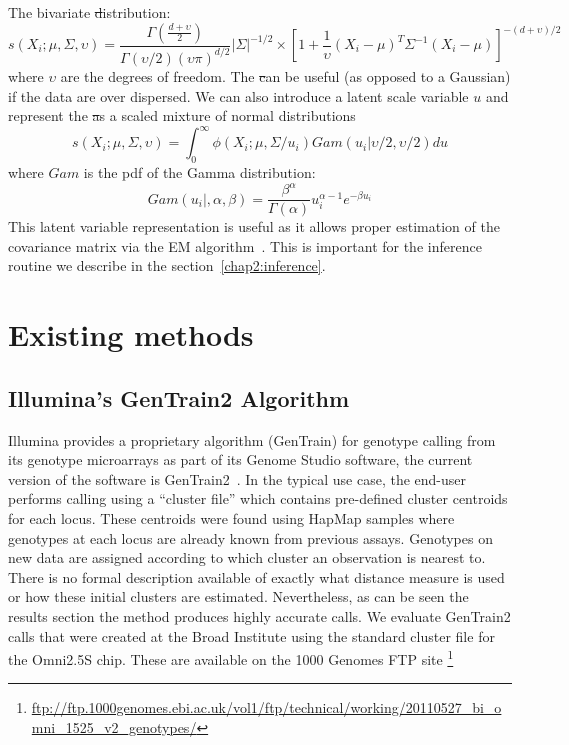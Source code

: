 The bivariate \st distribution:
$$s(X_i;\mu,\Sigma,\upsilon) = \frac{\Gamma(\frac{d+\upsilon}{2})}{\Gamma(\upsilon/2)(\upsilon\pi)^{d/2}}|\Sigma|^{-1/2} \times [1+\frac{1}{\upsilon}(X_i - \mu)^T \Sigma^{-1}(X_i - \mu)]^{-(d+\upsilon)/2}$$
where $\upsilon$ are the degrees of freedom.  The \st can be useful (as opposed to a Gaussian) if the data are over dispersed. We can also introduce a latent scale variable $u$ and represent the \st as a scaled mixture of normal distributions 
$$s(X_i;\mu,\Sigma,\upsilon) = \int_0^{\infty} \phi(X_i;\mu,\Sigma / u_i)Gam(u_i|\upsilon/2,\upsilon/2) du$$ where $Gam$ is the pdf of the Gamma distribution:
$$Gam(u_i|,\alpha,\beta) = \frac{\beta^\alpha}{\Gamma(\alpha)} u_i^{\alpha-1}e^{-\beta u_i}$$
This latent variable representation is useful as it allows proper estimation of the covariance matrix via the EM algorithm~\citep{peel2000robust}. This is important for the inference routine we describe in the section~\ref{chap2:inference}. 






\section{Existing methods}
\subsection{Illumina's GenTrain2 Algorithm}
Illumina provides a proprietary algorithm (GenTrain) for genotype calling from its genotype microarrays as part of its Genome Studio software, the current version of the software is GenTrain2~\citep{gentrain2}.  In the typical use case, the end-user performs calling using a ``cluster file'' which contains pre-defined cluster centroids for each locus. These centroids were found using HapMap samples where genotypes at each locus are already known from previous assays.  Genotypes on new data are assigned according to which cluster an observation is nearest to. There is no formal description available of exactly what distance measure is used or how these initial clusters are estimated.  Nevertheless, as can be seen the results section the method produces highly accurate calls. We evaluate GenTrain2 calls that were created at the Broad Institute using the standard cluster file for the Omni2.5S chip.  These are available on the 1000 Genomes FTP site \footnote{\url{ftp://ftp.1000genomes.ebi.ac.uk/vol1/ftp/technical/working/20110527_bi_omni_1525_v2_genotypes/}}

